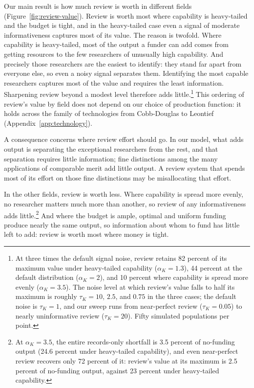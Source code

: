 \documentclass[article, 11pt, reqno]{amsart}
\theoremstyle{named}
\begin{document}


Our main result is how much review is worth in different fields (Figure~\ref{fig:review-value}). Review is worth most where capability is heavy-tailed and the budget is tight, and in the heavy-tailed case even a signal of moderate informativeness captures most of its value. The reason is twofold. Where capability is heavy-tailed, most of the output a funder can add comes from getting resources to the few researchers of unusually high capability. And precisely those researchers are the easiest to identify: they stand far apart from everyone else, so even a noisy signal separates them. Identifying the most capable researchers captures most of the value and requires the least information. Sharpening review beyond a modest level therefore adds little.\footnote{At three times the default signal noise, review retains 82 percent of its maximum value under heavy-tailed capability ($\alpha_K = 1.3$), 44 percent at the default distribution ($\alpha_K = 2$), and 10 percent where capability is spread more evenly ($\alpha_K = 3.5$). The noise level at which review's value falls to half its maximum is roughly $\tau_K = 10$, $2.5$, and $0.75$ in the three cases; the default noise is $\tau_K = 1$, and our sweep runs from near-perfect review ($\tau_K = 0.05$) to nearly uninformative review ($\tau_K = 20$). Fifty simulated populations per point.} This ordering of review's value by field does not depend on our choice of production function: it holds across the family of technologies from Cobb-Douglas to Leontief (Appendix~\ref{app:technology}).



A consequence concerns where review effort should go. In our model, what adds output is separating the exceptional researchers from the rest, and that separation requires little information; fine distinctions among the many applications of comparable merit add little output. A review system that spends most of its effort on those fine distinctions may be misallocating that effort.

In the other fields, review is worth less. Where capability is spread more evenly, no researcher matters much more than another, so review of any informativeness adds little.\footnote{At $\alpha_K = 3.5$, the entire records-only shortfall is 3.5 percent of no-funding output (24.6 percent under heavy-tailed capability), and even near-perfect review recovers only 72 percent of it: review's value at its maximum is 2.5 percent of no-funding output, against 23 percent under heavy-tailed capability.} And where the budget is ample, optimal and uniform funding produce nearly the same output, so information about whom to fund has little left to add: review is worth most where money is tight.
\end{document}
